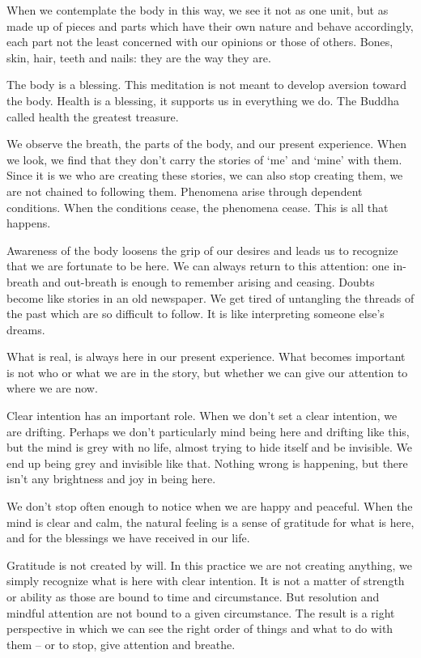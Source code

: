 When we contemplate the body in this way, we see it not as one unit, but
as made up of pieces and parts which have their own nature and behave
accordingly, each part not the least concerned with our opinions or
those of others. Bones, skin, hair, teeth and nails: they are the way
they are.

The body is a blessing. This meditation is not meant to develop aversion
toward the body. Health is a blessing, it supports us in everything we
do. The Buddha called health the greatest treasure.


We observe the breath, the parts of the body, and our present
experience. When we look, we find that they don't carry the stories of
`me' and `mine' with them. Since it is we who are creating these
stories, we can also stop creating them, we are not chained to following
them. Phenomena arise through dependent conditions. When the conditions
cease, the phenomena cease. This is all that happens.

Awareness of the body loosens the grip of our desires and leads us to
recognize that we are fortunate to be here. We can always return to this
attention: one in-breath and out-breath is enough to remember arising
and ceasing. Doubts become like stories in an old newspaper. We get
tired of untangling the threads of the past which are so difficult to
follow. It is like interpreting someone else's dreams.

What is real, is always here in our present experience. What becomes
important is not who or what we are in the story, but whether we can
give our attention to where we are now.

Clear intention has an important role. When we don't set a clear
intention, we are drifting. Perhaps we don't particularly mind being
here and drifting like this, but the mind is grey with no life, almost
trying to hide itself and be invisible. We end up being grey and
invisible like that. Nothing wrong is happening, but there isn't any
brightness and joy in being here.

We don't stop often enough to notice when we are happy and peaceful.
When the mind is clear and calm, the natural feeling is a sense of
gratitude for what is here, and for the blessings we have received in
our life.

\enlargethispage*{\baselineskip}

Gratitude is not created by will. In this practice we are not creating
anything, we simply recognize what is here with clear intention. It is
not a matter of strength or ability as those are bound to time and
circumstance. But resolution and mindful attention are not bound to a
given circumstance. The result is a right perspective in which we can
see the right order of things and what to do with them -- or to stop,
give attention and breathe.
